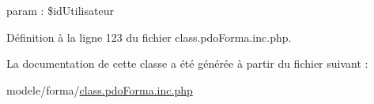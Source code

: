 param \+: \$id\+Utilisateur 

Définition à la ligne 123 du fichier class.\+pdo\+Forma.\+inc.\+php.



La documentation de cette classe a été générée à partir du fichier suivant \+:\begin{DoxyCompactItemize}
\item 
modele/forma/\hyperlink{class_8pdo_forma_8inc_8php}{class.\+pdo\+Forma.\+inc.\+php}\end{DoxyCompactItemize}
